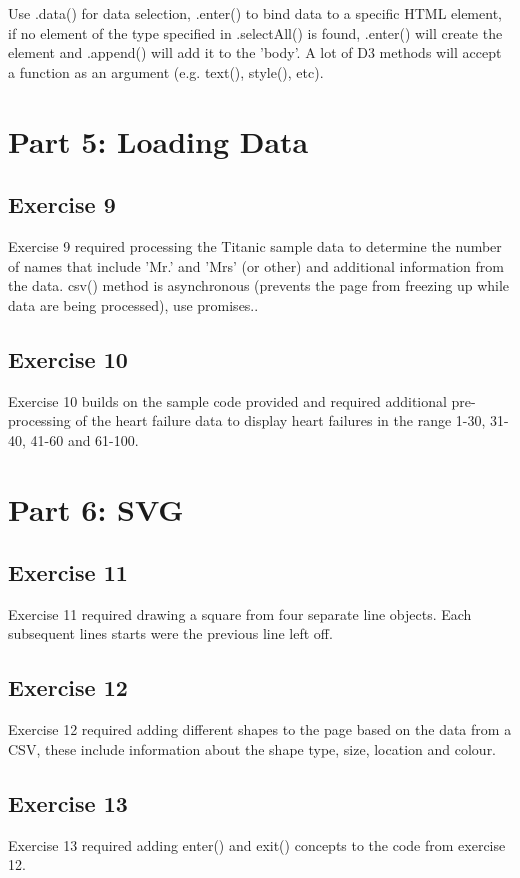 \documentclass[11pt]{article}   	%
\begin{document}
Use .data() for data selection, .enter() to bind data to a specific HTML element, if no element of the type specified in .selectAll() is found, .enter() will create the element and .append() will add it to the 'body'. \linebreak
A lot of D3 methods will accept a function as an argument (e.g. text(), style(), etc).


\section{Part 5: Loading Data}
\subsection{Exercise 9 }
Exercise 9 required processing the Titanic sample data to determine the number of names that include 'Mr.' and 'Mrs' (or other) and additional information from the data. csv() method is asynchronous (prevents the page from freezing up while data are being processed), use promises..

\subsection{Exercise 10 }
Exercise 10 builds on the sample code provided and required additional pre-processing of the heart failure data to display heart failures in the range 1-30, 31-40, 41-60 and 61-100.


\section{Part 6: SVG}
\subsection{Exercise 11 }
Exercise 11 required drawing a square from four separate line objects. Each subsequent lines starts were the previous line left off.

\subsection{Exercise 12 }
Exercise 12 required adding different shapes to the page based on the data from a CSV, these include information about the shape type, size, location and colour.

\subsection{ Exercise 13 }
Exercise 13 required adding  enter() and exit() concepts to the code from exercise 12.
\end{document}
